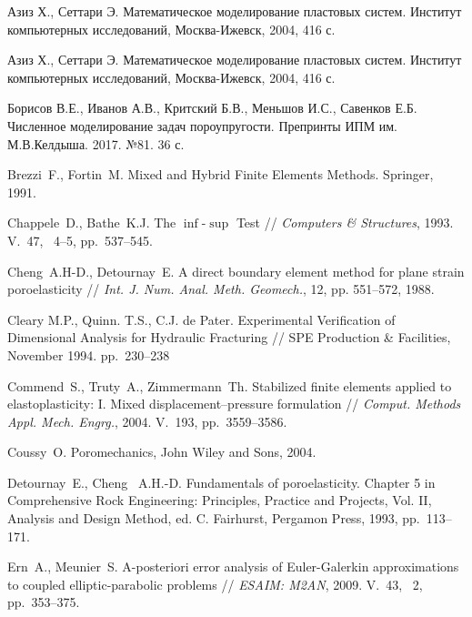 
\begin{thebibliography}{1000}


Азиз Х., Сеттари Э.  Математическое
моделирование пластовых систем.  Институт компьютерных исследований,
Москва-Ижевск, 2004, 416 с.

Азиз Х., Сеттари Э.  Математическое
моделирование пластовых систем.  Институт компьютерных исследований,
Москва-Ижевск, 2004, 416 с.

Борисов В.Е., Иванов А.В., Критский Б.В., Меньшов И.С., Савенков Е.Б. Численное  моделирование задач
пороупругости. Препринты ИПМ им. М.В.Келдыша. 2017. №81. 
36 с.

Brezzi~F., Fortin~M. Mixed and Hybrid Finite Elements Methods.
Springer, 1991.

Chappele~D., Bathe~K.J.
The $\inf$-$\sup$ Test //
\emph{Computers \& Structures}, 1993.
V.~47, \No~4--5, pp.~537--545.

Cheng~A.H-D., Detournay~E. 
A direct boundary element method for plane strain
poroelasticity // \emph{Int. J. Num. Anal. Meth. Geomech.}, 12, pp. 551--572, 1988.

Cleary M.P., Quinn. T.S., C.J. de Pater.
Experimental Verification of Dimensional Analysis for Hydraulic Fracturing // 
SPE Production \& Facilities, November 1994.
pp.~230--238

Commend~S., Truty~A.,  Zimmermann~Th.
Stabilized finite elements applied to elastoplasticity: I. Mixed displacement–pressure formulation //
\emph{Comput. Methods Appl. Mech. Engrg.}, 2004.
V.~193, pp.~3559--3586.

Coussy~O. Poromechanics, John Wiley and Sons, 2004.

Detournay~E., Cheng~ A.H.-D. 
Fundamentals of poroelasticity.
Chapter 5 in Comprehensive Rock Engineering: Principles, Practice and Projects, Vol. II, Analysis and
Design Method, ed. C. Fairhurst, Pergamon Press, 1993, pp.~113--171.

Ern~A., Meunier~S.
A-posteriori error analysis of Euler-Galerkin
approximations to coupled elliptic-parabolic problems // \emph{ESAIM: M2AN}, 2009.
V.~43, \No~2, pp.~353--375.


\end{thebibliography}
